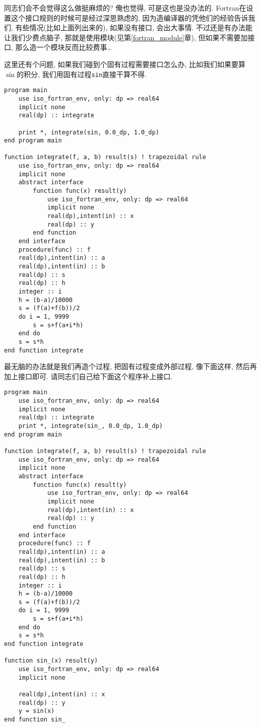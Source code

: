 同志们会不会觉得这么做挺麻烦的? 俺也觉得, 可是这也是没办法的. Fortran在设置这个接口规则的时候可是经过深思熟虑的, 因为造编译器的凭他们的经验告诉我们, 有些情况(比如上面列出来的), 如果没有接口, 会出大事情. 不过还是有办法能让我们少费点脑子, 那就是使用模块(见第\ref{fortran_module}章), 但如果不需要加接口, 那么造一个模块反而比较费事\dots

这里还有个问题, 如果我们碰到个固有过程需要接口怎么办, 比如我们如果要算$\sin$的积分, 我们用固有过程\texttt{sin}直接干算不得.
\begin{lstlisting}
program main
    use iso_fortran_env, only: dp => real64
    implicit none
    real(dp) :: integrate

    print *, integrate(sin, 0.0_dp, 1.0_dp)
end program main

function integrate(f, a, b) result(s) ! trapezoidal rule
    use iso_fortran_env, only: dp => real64
    implicit none
    abstract interface
        function func(x) result(y)
            use iso_fortran_env, only: dp => real64
            implicit none
            real(dp),intent(in) :: x
            real(dp) :: y
        end function
    end interface
    procedure(func) :: f
    real(dp),intent(in) :: a
    real(dp),intent(in) :: b
    real(dp) :: s
    real(dp) :: h
    integer :: i
    h = (b-a)/10000
    s = (f(a)+f(b))/2
    do i = 1, 9999
        s = s+f(a+i*h)
    end do
    s = s*h
end function integrate
\end{lstlisting}
最无脑的办法就是我们再造个过程, 把固有过程变成外部过程, 像下面这样, 然后再加上接口即可. 请同志们自己给下面这个程序补上接口.
\begin{lstlisting}
program main
    use iso_fortran_env, only: dp => real64
    implicit none
    real(dp) :: integrate
    print *, integrate(sin_, 0.0_dp, 1.0_dp)
end program main

function integrate(f, a, b) result(s) ! trapezoidal rule
    use iso_fortran_env, only: dp => real64
    implicit none
    abstract interface
        function func(x) result(y)
            use iso_fortran_env, only: dp => real64
            implicit none
            real(dp),intent(in) :: x
            real(dp) :: y
        end function
    end interface
    procedure(func) :: f
    real(dp),intent(in) :: a
    real(dp),intent(in) :: b
    real(dp) :: s
    real(dp) :: h
    integer :: i
    h = (b-a)/10000
    s = (f(a)+f(b))/2
    do i = 1, 9999
        s = s+f(a+i*h)
    end do
    s = s*h
end function integrate

function sin_(x) result(y)
    use iso_fortran_env, only: dp => real64
    implicit none

    real(dp),intent(in) :: x
    real(dp) :: y
    y = sin(x)
end function sin_
\end{lstlisting}

